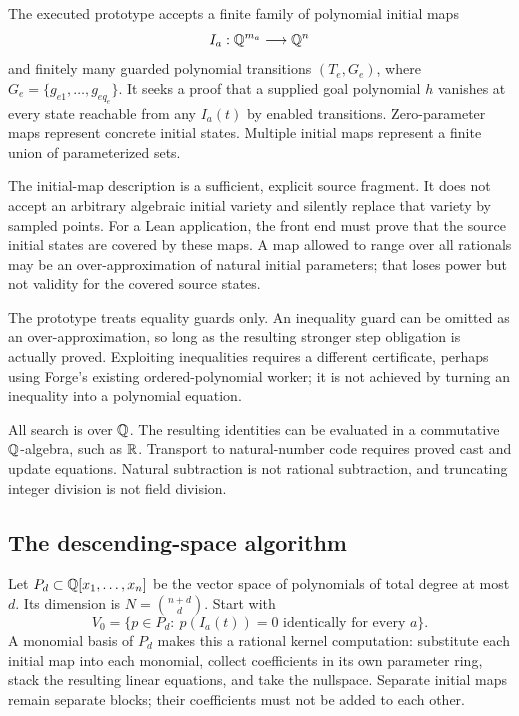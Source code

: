 The executed prototype accepts a finite family of polynomial initial maps
\[
 I_a:\mathbb{Q}^{m_a}\longrightarrow\mathbb{Q}^n
\]
and finitely many guarded polynomial transitions $(T_e,G_e)$, where
$G_e=\{g_{e1},\ldots,g_{eq_e}\}$. It seeks a proof that a supplied goal polynomial
$h$ vanishes at every state reachable from any $I_a(t)$ by enabled transitions.
Zero-parameter maps represent concrete initial states. Multiple initial maps
represent a finite union of parameterized sets.

The initial-map description is a sufficient, explicit source fragment. It does
not accept an arbitrary algebraic initial variety and silently replace that
variety by sampled points. For a Lean application, the front end must prove
that the source initial states are covered by these maps. A map allowed to
range over all rationals may be an over-approximation of natural initial
parameters; that loses power but not validity for the covered source states.

The prototype treats equality guards only. An inequality guard can be omitted
as an over-approximation, so long as the resulting stronger step obligation is
actually proved. Exploiting inequalities requires a different certificate,
perhaps using Forge's existing ordered-polynomial worker; it is not achieved by
turning an inequality into a polynomial equation.

All search is over $\mathbb{Q}$. The resulting identities can be evaluated in a
commutative $\mathbb{Q}$-algebra, such as $\mathbb{R}$. Transport to natural-number code requires
proved cast and update equations. Natural subtraction is not rational
subtraction, and truncating integer division is not field division.

\subsection{The descending-space algorithm}

Let $P_d\subset\mathbb{Q}[x_1,\ldots,x_n]$ be the vector space of polynomials of total
degree at most $d$. Its dimension is $N=\binom{n+d}{d}$. Start with
\begin{equation}
 V_0=\{p\in P_d:\ p(I_a(t))=0\text{ identically for every }a\}.
 \label{eq:initial-space}
\end{equation}
A monomial basis of $P_d$ makes this a rational kernel computation: substitute
each initial map into each monomial, collect coefficients in its own parameter
ring, stack the resulting linear equations, and take the nullspace. Separate
initial maps remain separate blocks; their coefficients must not be added to
each other.

